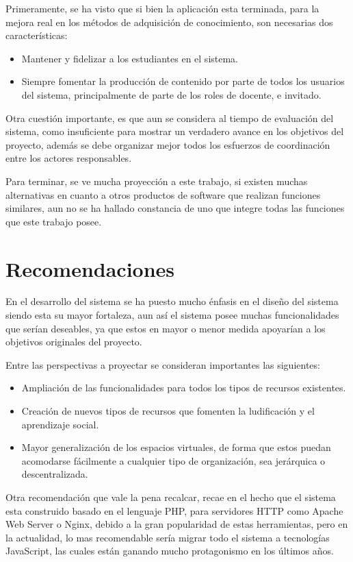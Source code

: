 Primeramente, se ha visto que si bien la aplicación esta terminada, para la
mejora real en los métodos de adquisición de conocimiento, son necesarias dos
características:

\begin{itemize}
\item Mantener y fidelizar a los estudiantes en el sistema.
\item Siempre fomentar la producción de contenido por parte de todos los
usuarios del sistema, principalmente de parte de los roles de docente, e
invitado.
\end{itemize}

Otra cuestión importante, es que aun se considera al tiempo de evaluación del
sistema, como insuficiente para mostrar un verdadero avance en los objetivos del
proyecto, además se debe organizar mejor todos los esfuerzos de coordinación
entre los actores responsables.

Para terminar, se ve mucha proyección a este trabajo, si existen muchas
alternativas en cuanto a otros productos de software que realizan funciones
similares, aun no se ha hallado constancia de uno que integre todas las
funciones que este trabajo posee.

\section{Recomendaciones}
En el desarrollo del sistema se ha puesto mucho énfasis en el diseño del sistema
siendo esta su mayor fortaleza, aun así el sistema posee muchas funcionalidades
que serían deseables, ya que estos en mayor o menor medida apoyarían a los
objetivos originales del proyecto.

Entre las perspectivas a proyectar se consideran importantes las siguientes:

\begin{itemize}
\item Ampliación de las funcionalidades para todos los tipos de recursos
existentes.
\item Creación de nuevos tipos de recursos que fomenten la ludificación y el
aprendizaje social.
\item Mayor generalización de los espacios virtuales, de forma que estos puedan
acomodarse fácilmente a cualquier tipo de organización, sea jerárquica o
descentralizada.
\end{itemize}

Otra recomendación que vale la pena recalcar, recae en el hecho que el sistema
esta construido basado en el lenguaje PHP, para servidores HTTP como Apache Web
Server o Nginx, debido a la gran popularidad de estas herramientas, pero en la
actualidad, lo mas recomendable sería migrar todo el sistema a tecnologías
JavaScript, las cuales están ganando mucho protagonismo en los últimos años.

